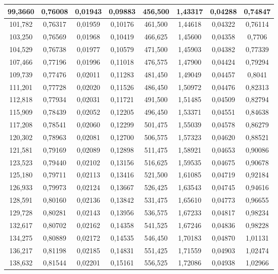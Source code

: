 \documentclass[a4paper,12pt]{article}
\numberwithin{equation}{section}
\begin{document}
\begin{appendices}
\begin{longtable}[c]{|c|c|c|c|c|c|c|c|}
99,3660	&	0,76008	&	0,01943	&	0,09883	&	456,500	&	1,43317	&	0,04288	&	0,74847	\\\hline
101,782	&	0,76317	&	0,01959	&	0,10176	&	461,500	&	1,44618	&	0,04322	&	0,76114	\\\hline
103,250	&	0,76569	&	0,01968	&	0,10419	&	466,625	&	1,45600	&	0,04358	&	0,7706	\\\hline
104,529	&	0,76738	&	0,01977	&	0,10579	&	471,500	&	1,45903	&	0,04382	&	0,77339	\\\hline
107,466	&	0,77196	&	0,01996	&	0,11018	&	476,575	&	1,47900	&	0,04424	&	0,79294	\\\hline
109,739	&	0,77476	&	0,02011	&	0,11283	&	481,450	&	1,49049	&	0,04457	&	0,8041	\\\hline
111,201	&	0,77728	&	0,02020	&	0,11526	&	486,450	&	1,50972	&	0,04476	&	0,82313	\\\hline
112,818	&	0,77934	&	0,02031	&	0,11721	&	491,500	&	1,51485	&	0,04509	&	0,82794	\\\hline
115,909	&	0,78439	&	0,02052	&	0,12205	&	496,450	&	1,53371	&	0,04551	&	0,84638	\\\hline
117,208	&	0,78541	&	0,02060	&	0,12299	&	501,475	&	1,55039	&	0,04578	&	0,86279	\\\hline
120,302	&	0,78963	&	0,02081	&	0,12700	&	506,575	&	1,57323	&	0,04620	&	0,88521	\\\hline
121,581	&	0,79169	&	0,02089	&	0,12898	&	511,475	&	1,58921	&	0,04653	&	0,90086	\\\hline
123,523	&	0,79440	&	0,02102	&	0,13156	&	516,625	&	1,59535	&	0,04675	&	0,90678	\\\hline
125,180	&	0,79711	&	0,02113	&	0,13416	&	521,500	&	1,61085	&	0,04719	&	0,92184	\\\hline
126,933	&	0,79973	&	0,02124	&	0,13667	&	526,425	&	1,63543	&	0,04745	&	0,94616	\\\hline
128,591	&	0,80160	&	0,02136	&	0,13842	&	531,475	&	1,65610	&	0,04773	&	0,96655	\\\hline
129,728	&	0,80281	&	0,02143	&	0,13956	&	536,575	&	1,67233	&	0,04817	&	0,98234	\\\hline
132,617	&	0,80702	&	0,02162	&	0,14358	&	541,525	&	1,67246	&	0,04836	&	0,98228	\\\hline
134,275	&	0,80889	&	0,02172	&	0,14535	&	546,450	&	1,70183	&	0,04870	&	1,01131	\\\hline
136,217	&	0,81198	&	0,02185	&	0,14831	&	551,425	&	1,71559	&	0,04903	&	1,02474	\\\hline
138,632	&	0,81544	&	0,02201	&	0,15161	&	556,525	&	1,72086	&	0,04938	&	1,02966	\\\hline

\end{longtable}
\end{appendices}
\end{document}
